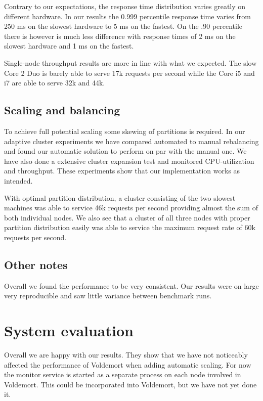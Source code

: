 Contrary to our expectations, the response time distribution varies greatly on different hardware. In our results the 0.999 percentile response time varies from 250 ms on the slowest hardware to 5 ms on the fastest. On the .90 percentile there is however is much less difference with response times of 2 ms on the slowest hardware and 1 ms on the fastest.

Single-node throughput results are more in line with what we expected. The slow Core 2 Duo is barely able to serve 17k requests per second while the Core i5 and i7 are able to serve 32k and 44k. 

\subsection{Scaling and balancing}
\label{eval:balance}
To achieve full potential scaling some skewing of partitions is required. In our adaptive cluster experiments we have compared automated to manual rebalancing and found our automatic solution to perform on par with the manual one. We have also done a extensive cluster expansion test and monitored CPU-utilization and throughput. These experiments show that our implementation works as intended. 

With optimal partition distribution, a cluster consisting of the two slowest machines was able to service 46k requests per second providing almost the sum of both individual nodes. We also see that a cluster of all three nodes with proper partition distribution easily was able to service the maximum request rate of 60k requests per second. 

\subsection{Other notes}
Overall we found the performance to be very consistent. Our results were on large very reproducible and saw little variance between benchmark runs.


\section{System evaluation}
\label{eval:discussion}
Overall we are happy with our results. They show that we have not noticeably affected the performance of Voldemort when adding automatic scaling. For now the monitor service is started as a separate process on each node involved in Voldemort. This could be incorporated into Voldemort, but we have not yet done it.  

